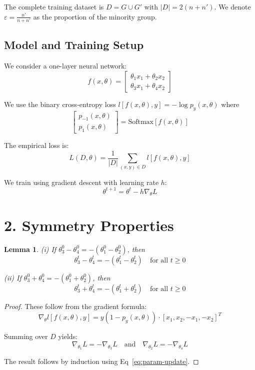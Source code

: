 \documentclass[11pt]{article}
\newtheorem{lemma}{Lemma}
\begin{document}
The complete training dataset is $D = G \cup G'$ with $|D| = 2(n + n')$. We denote $\varepsilon = \frac{n'}{n+n'}$ as the proportion of the minority group.

\subsection*{Model and Training Setup}

We consider a one-layer neural network:
$$f(x, \theta) = \begin{bmatrix} \theta_1 x_1 + \theta_2 x_2 \\ \theta_3 x_1 + \theta_4 x_2 \end{bmatrix}$$

We use the binary cross-entropy loss $l[f(x, \theta), y] = -\log p_y(x, \theta)$ where
$$\begin{bmatrix} p_{-1}(x, \theta) \\ p_1(x, \theta) \end{bmatrix} = \text{Softmax}[f(x, \theta)]$$

The empirical loss is:
$$L(D, \theta) = \frac{1}{|D|} \sum_{(x, y) \in D} l[f(x, \theta), y]$$

We train using gradient descent with learning rate $h$:
\begin{equation}
\label{eq:param-update}
\theta^{t+1} = \theta^{t} - h \nabla_\theta L
\end{equation}

\section*{2. Symmetry Properties}

\begin{lemma}
\label{lem:symmetry}
\textup{(i)} If $\theta_3^0 - \theta_4^0 = -(\theta_1^0 - \theta_2^0)$, then
$$\theta_3^t - \theta_4^t = -(\theta_1^t - \theta_2^t) \quad \text{for all } t \geq 0$$

\textup{(ii)} If $\theta_3^0 + \theta_4^0 = -(\theta_1^0 + \theta_2^0)$, then
$$\theta_3^t + \theta_4^t = -(\theta_1^t + \theta_2^t) \quad \text{for all } t \geq 0$$
\end{lemma}

\begin{proof}
These follow from the gradient formula:
\begin{equation}
\label{eq:diff-l}
\nabla_\theta l[f(x, \theta), y] = y(1 - p_y(x, \theta)) \cdot [x_1, x_2, -x_1, -x_2]^T
\end{equation}

Summing over $D$ yields:
\begin{equation}
\label{eq:symmetry-diff-L}
\nabla_{\theta_1} L = -\nabla_{\theta_3} L \quad \text{and} \quad \nabla_{\theta_2} L = -\nabla_{\theta_4} L
\end{equation}

The result follows by induction using Eq~\eqref{eq:param-update}.
\end{proof}
\end{document}
